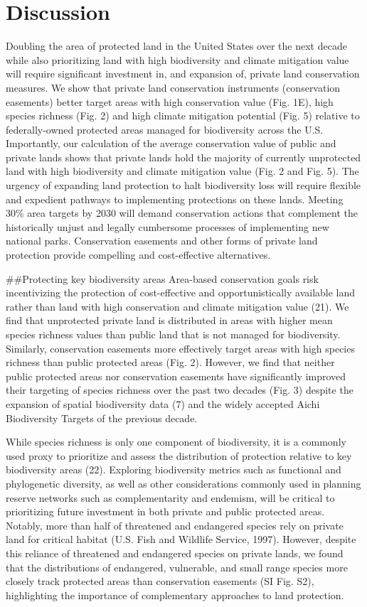 \documentclass[3p]{elsarticle} %
\begin{document}
\hypertarget{discussion}{%
\section{Discussion}\label{discussion}}

Doubling the area of protected land in the United States over the next
decade while also prioritizing land with high biodiversity and climate
mitigation value will require significant investment in, and expansion
of, private land conservation measures. We show that private land
conservation instruments (conservation easements) better target areas
with high conservation value (Fig. 1E), high species richness (Fig. 2)
and high climate mitigation potential (Fig. 5) relative to
federally-owned protected areas managed for biodiversity across the U.S.
Importantly, our calculation of the average conservation value of public
and private lands shows that private lands hold the majority of
currently unprotected land with high biodiversity and climate mitigation
value (Fig. 2 and Fig. 5). The urgency of expanding land protection to
halt biodiversity loss will require flexible and expedient pathways to
implementing protections on these lands. Meeting 30\% area targets by
2030 will demand conservation actions that complement the historically
unjust and legally cumbersome processes of implementing new national
parks. Conservation easements and other forms of private land protection
provide compelling and cost-effective alternatives.

\#\#Protecting key biodiversity areas Area-based conservation goals risk
incentivizing the protection of cost-effective and opportunistically
available land rather than land with high conservation and climate
mitigation value (21). We find that unprotected private land is
distributed in areas with higher mean species richness values than
public land that is not managed for biodiversity. Similarly,
conservation easements more effectively target areas with high species
richness than public protected areas (Fig. 2). However, we find that
neither public protected areas nor conservation easements have
significantly improved their targeting of species richness over the past
two decades (Fig. 3) despite the expansion of spatial biodiversity data
(7) and the widely accepted Aichi Biodiversity Targets of the previous
decade.

While species richness is only one component of biodiversity, it is a
commonly used proxy to prioritize and assess the distribution of
protection relative to key biodiversity areas (22). Exploring
biodiversity metrics such as functional and phylogenetic diversity, as
well as other considerations commonly used in planning reserve networks
such as complementarity and endemism, will be critical to prioritizing
future investment in both private and public protected areas. Notably,
more than half of threatened and endangered species rely on private land
for critical habitat (U.S. Fish and Wildlife Service, 1997). However,
despite this reliance of threatened and endangered species on private
lands, we found that the distributions of endangered, vulnerable, and
small range species more closely track protected areas than conservation
easements (SI Fig. S2), highlighting the importance of complementary
approaches to land protection.
\end{document}

